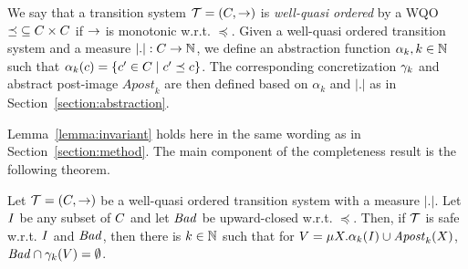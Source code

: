 We say that a transition system ${\mathcal T} = (C,{\rightarrow})$ is
\emph{well-quasi ordered} by a WQO ${\preceq}\subseteq C\times C$ if
$\rightarrow$ is monotonic w.r.t. ${\preceq}$.
%
Given a well-quasi ordered transition system and
a measure $|.|:C\rightarrow\mathbb N$,
we define an abstraction function $\alpha_k,k\in\mathbb N$ such that
$\alpha_k(c) = \{c'\in C\mid c'\preceq c\}$. The 
corresponding concretization $\gamma_{k}$ and abstract post-image
$\mathit{Apost}_k$ are then defined based on $\alpha_k$ and $|.|$ as in
Section~\ref{section:abstraction}. 
%

Lemma~\ref{lemma:invariant} holds here in the same wording as in Section~\ref{section:method}.
%
%
%
%
%
%
%
%
The main component of the completeness result is  the following theorem. 
%
\newcommand{\theoremtext}{
Let $\transys = (\confs,{\trans})$ be a well-quasi ordered transition system with a measure $|.|$.
Let $\inits$ be any subset of $\confs$ and let $\bad$ be upward-closed w.r.t. $\preceq$.
Then, if $\transys$ is safe w.r.t. $\inits$ and $\bad$, then there is $k\in \nat$ such that for  $\Vk = \mu X. \projof \inits k \cup \apostof X k$, $\bad \cap \gammaof k (\Vk) =\emptyset$.
}
\begin{theorem} 
\label{theorem:completeness}
\theoremtext
\end{theorem}

